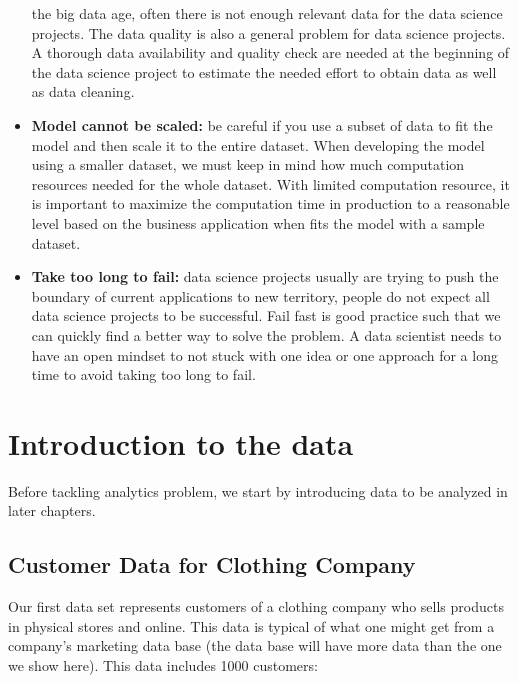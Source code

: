 \documentclass[12pt,]{krantz}
\theoremstyle{definition}
\theoremstyle{definition}
\theoremstyle{definition}
\theoremstyle{remark}
\begin{document}
\begin{itemize}
  the big data age, often there is not enough relevant data for the data
  science projects. The data quality is also a general problem for data
  science projects. A thorough data availability and quality check are
  needed at the beginning of the data science project to estimate the
  needed effort to obtain data as well as data cleaning.
\item
  \textbf{Model cannot be scaled:} be careful if you use a subset of
  data to fit the model and then scale it to the entire dataset. When
  developing the model using a smaller dataset, we must keep in mind how
  much computation resources needed for the whole dataset. With limited
  computation resource, it is important to maximize the computation time
  in production to a reasonable level based on the business application
  when fits the model with a sample dataset.
\item
  \textbf{Take too long to fail:} data science projects usually are
  trying to push the boundary of current applications to new territory,
  people do not expect all data science projects to be successful. Fail
  fast is good practice such that we can quickly find a better way to
  solve the problem. A data scientist needs to have an open mindset to
  not stuck with one idea or one approach for a long time to avoid
  taking too long to fail.
\end{itemize}

\chapter{Introduction to the data}\label{introduction-to-the-data}

Before tackling analytics problem, we start by introducing data to be
analyzed in later chapters.

\section{Customer Data for Clothing
Company}\label{customer-data-for-clothing-company}

Our first data set represents customers of a clothing company who sells
products in physical stores and online. This data is typical of what one
might get from a company's marketing data base (the data base will have
more data than the one we show here). This data includes 1000 customers:
\end{document}
